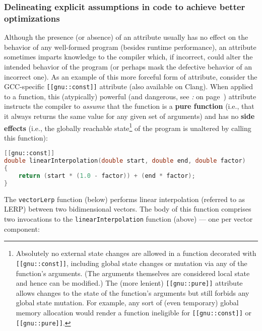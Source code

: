 \subsubsection[Delineating explicit assumptions in code to achieve better optimizations]{Delineating explicit assumptions in code to achieve better optimizations}\label{delineating-explicit-assumptions-in-code-to-achieve-better-optimizations}

Although the presence (or absence) of an attribute usually has no effect
on the behavior of any well-formed program (besides runtime performance),
an attribute sometimes imparts knowledge to the compiler
which, if incorrect, could alter the intended behavior of the program
(or perhaps mask the defective behavior of an incorrect one). As an
example of this more forceful form of attribute, consider the
GCC-specific \texttt{[[gnu::const]]} attribute (also available on
Clang). When applied to a function, this (atypically) powerful (and
dangerous, see {\it{}:} {\it{}} on page~\pageref{some-attributes,-if-misused,-can-affect-program-correctness}) attribute instructs the compiler to \emph{assume}
that the function is a \textbf{pure function} (i.e., that it always
returns the same value for any given set of arguments) and has no
\textbf{side effects} (i.e., the globally reachable
state{\cprotect\footnote{Absolutely no external state changes are
allowed in a function decorated with \texttt{[[gnu::const]]},
including global state changes or mutation via any of the function's
arguments. (The arguments themselves are considered local state and
hence can be modified.) The (more lenient) \texttt{[[gnu::pure]]}
attribute allows changes to the state of the function's arguments but still
forbids any global state mutation. For example, any sort of (even
temporary) global memory allocation would render a function ineligible
  for \texttt{[[gnu::const]]} or \texttt{[[gnu::pure]]}.}} of the
program is unaltered by calling this function):

\begin{lstlisting}[language=C++]
[[gnu::const]]
double linearInterpolation(double start, double end, double factor)
{
    return (start * (1.0 - factor)) + (end * factor);
}
\end{lstlisting}

\noindent The \texttt{vectorLerp} function (below) performs linear
interpolation (referred to as LERP) between two bidimen\-sional vectors. The body
of this function comprises two invocations to the
\mbox{\texttt{linearInterpolation}} function (above) --- one per vector
component:

